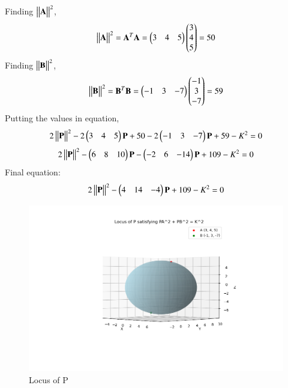 \documentclass[journal]{IEEEtran}
\numberwithin{equation}{enumi}
\numberwithin{figure}{enumi}
\begin{document}
Finding $\mydet{\mydet{\vec{A}}}^2$,
\begin{align}
\mydet{\mydet{\vec{A}}}^2=\vec{A}^T\vec{A}=\myvec{3&4&5}\myvec{3\\4\\5}=50
\end{align}
Finding $\mydet{\mydet{\vec{B}}}^2$,
\begin{align}
\mydet{\mydet{\vec{B}}}^2=\vec{B}^T\vec{B}=\myvec{-1&3&-7}\myvec{-1\\3\\-7}=59
\end{align}
Putting the values in equation, 
\begin{align}
	2\mydet{\mydet{\vec{P}}}^2  -2\myvec{3&4&5}\vec{P}+50-2\myvec{-1&3&-7}\vec{P}+59-K^2=0
\end{align}
\begin{align}
	2\mydet{\mydet{\vec{P}}}^2  -\myvec{6&8&10}\vec{P}-\myvec{-2&6&-14}\vec{P}+109-K^2=0
\end{align}
Final equation:
\begin{align}
	2\mydet{\mydet{\vec{P}}}^2  -\myvec{4&14&-4}\vec{P}+109-K^2=0
\end{align}\begin{figure}[h!]
   \centering
   \includegraphics[width=0.9\linewidth]{Figure_1.png}
	\caption{Locus of P }
   \label{stemplot}
\end{figure}
\end{document}

